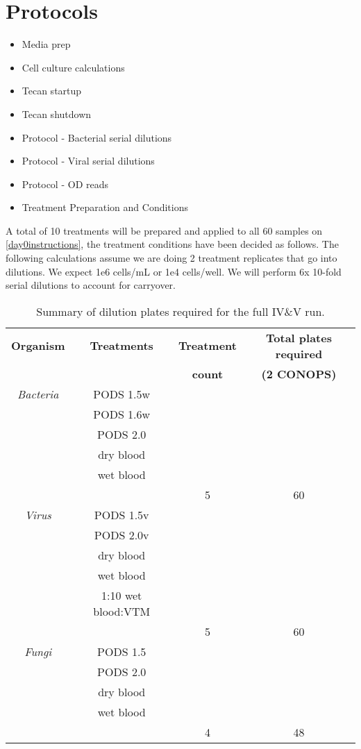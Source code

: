 \documentclass{article}
\newcounter{comments}
\newcommand{\bradley}[1]{{\addtocounter{comments}{1}}{\color{violet}{[\textbf{TODO Bradley \thecomments :}\ #1]}}}
\begin{document}
\section{Protocols}
\begin{itemize}
    \item Media prep
    \item Cell culture calculations
    \item Tecan startup
    \item Tecan shutdown
    \item Protocol - Bacterial serial dilutions
    \item Protocol - Viral serial dilutions
    \item Protocol - OD reads
    \item Treatment Preparation and Conditions \bradley{}
\end{itemize}
A total of 10 treatments will be prepared and applied to all 60 samples on  \ref{day0instructions}, the treatment conditions have been decided as follows. The following calculations assume we are doing 2 treatment replicates that go into dilutions. We expect 1e6 cells/mL or 1e4 cells/well. We will perform 6x 10-fold serial dilutions to account for carryover.
\begin{table}
  \centering
  \begin{tabular}[]{|c|c|c|c|}
    \hline\hline
    \textbf{Organism} & \textbf{Treatments} & \textbf{Treatment} & \textbf{Total plates required} \\
     &  & \textbf{count} & \textbf{(2 CONOPS)} \\
    \hline
    \textit{Bacteria} & PODS 1.5w  & & \\
     & PODS 1.6w  & & \\
     & PODS 2.0  & & \\
     & dry blood  & & \\
     & wet blood  & & \\
    \hline
    & & 5 & 60\\
    \hline
    \textit{Virus} & PODS 1.5v  & & \\
     & PODS 2.0v  & & \\
     & dry blood  & & \\
     & wet blood  & & \\
             & 1:10 wet blood:VTM  & & \\
    \hline
    & & 5 & 60\\
    \hline
    \textit{Fungi} & PODS 1.5  & & \\
     & PODS 2.0  & & \\
     & dry blood  & & \\
     & wet blood  & & \\
    \hline
    & & 4 & 48\\
    \hline
    \hline

  \end{tabular}
  \caption{Summary of dilution plates required for the full IV\&V run.}
  \label{tab:dilution-plan}
\end{table}
\end{document}
